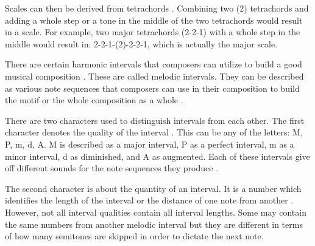         
        Scales can then be derived from tetrachords \citep{spencer1996music}. Combining two (2) tetrachords and adding a whole step or a tone in the middle of the two tetrachords would result in a scale. For example, two major tetrachords (2-2-1) with a whole step in the middle would result in: 2-2-1-(2)-2-2-1, which is actually the major scale.
        
        
        There are certain harmonic intervals that composers can utilize to build a good musical composition \citep{spencer1996music}. These are called melodic intervals. They can be described as various note sequences that composers can use in their composition to build the motif or the whole composition as a whole \citep{spencer1996music}. 
        
        There are two characters used to distinguish intervals from each other. The first character denotes the quality of the interval \citep{spencer1996music}. This can be any of the letters: M, P, m, d, A. M is described as a major interval, P as a perfect interval, m as a minor interval, d as diminished, and A as augmented. Each of these intervals give off different sounds for the note sequences they produce \citep{spencer1996music}.
        
        The second character is about the quantity of an interval. It is a number which identifies the length of the interval or the distance of one note from another \citep{spencer1996music}. However, not all interval qualities contain all interval lengths. Some may contain the same numbers from another melodic interval but they are different in terms of how many semitones are skipped in order to dictate the next note.
        
